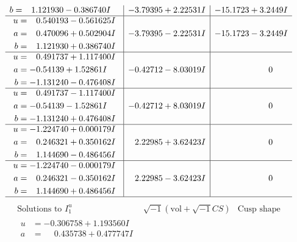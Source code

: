 \documentclass[1p]{elsarticle_modified}
\theoremstyle{definition}
\newcommand{\I}{\sqrt{-1}}
\begin{document}
$$\begin{array}{c|c|c}
\begin{aligned}
b &= \phantom{-}1.121930 - 0.386740 I\end{aligned}
 & -3.79395 + 2.22531 I & -15.1723 + 3.2449 I \\ \hline\begin{aligned}
u &= \phantom{-}0.540193 - 0.561625 I \\
a &= \phantom{-}0.470096 + 0.502904 I \\
b &= \phantom{-}1.121930 + 0.386740 I\end{aligned}
 & -3.79395 - 2.22531 I & -15.1723 - 3.2449 I \\ \hline\begin{aligned}
u &= \phantom{-}0.491737 + 1.117400 I \\
a &= -0.54139 + 1.52861 I \\
b &= -1.131240 - 0.476408 I\end{aligned}
 & -0.42712 - 8.03019 I & \phantom{-0.000000 } 0 \\ \hline\begin{aligned}
u &= \phantom{-}0.491737 - 1.117400 I \\
a &= -0.54139 - 1.52861 I \\
b &= -1.131240 + 0.476408 I\end{aligned}
 & -0.42712 + 8.03019 I & \phantom{-0.000000 } 0 \\ \hline\begin{aligned}
u &= -1.224740 + 0.000179 I \\
a &= \phantom{-}0.246321 + 0.350162 I \\
b &= \phantom{-}1.144690 - 0.486456 I\end{aligned}
 & \phantom{-}2.22985 + 3.62423 I & \phantom{-0.000000 } 0 \\ \hline\begin{aligned}
u &= -1.224740 - 0.000179 I \\
a &= \phantom{-}0.246321 - 0.350162 I \\
b &= \phantom{-}1.144690 + 0.486456 I\end{aligned}
 & \phantom{-}2.22985 - 3.62423 I & \phantom{-0.000000 } 0\\
 \hline 
 \end{array}$$\newpage$$\begin{array}{c|c|c}  
\text{Solutions to }I^u_{1}& \I (\text{vol} + \sqrt{-1}CS) & \text{Cusp shape}\\
 \hline 
\begin{aligned}
u &= -0.306758 + 1.193560 I \\
a &= \phantom{-}0.435738 + 0.477747 I \\

\end{aligned}
\end{array}$$
\end{document}
